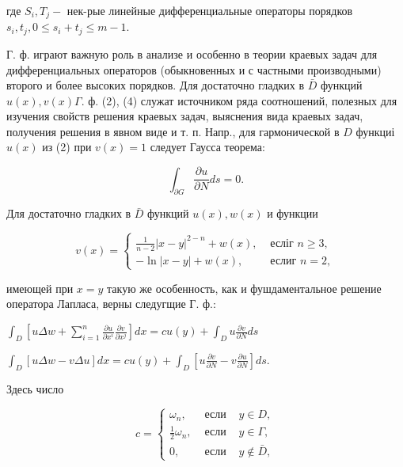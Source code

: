 \documentclass[10pt]{article}
\begin{document}
где $S_{i}, T_{j}-$ нек-рые линейные дифференциальные операторы порядков $s_{i}, t_{j}, 0 \leqslant s_{i}+t_{j} \leqslant m-1$.



Г. ф. играют важную роль в анализе и особенно в теории краевых задач для дифференциальных операторов (обыкновенных и с частными производными) второго и более высоких порядков. Для достаточно гладких в $\bar{D}$ функций $u(x), v(x) \Gamma$. ф. (2), (4) служат источником ряда соотношений, полезных для изучения свойств решения краевых задач, выяснения вида краевых задач, получения решения в явном виде и т. п. Напр., для гармонической в $D$ функциі $u(x)$ из (2) при $v(x)=1$ следует Гаусса теорема:



\[

\int_{\partial G} \frac{\partial u}{\partial N} d s=0 .

\]



Для достаточно гладких в $\bar{D}$ функций $u(x), w(x)$ и функции



\[

v(x)= \begin{cases}\frac{1}{n-2}|x-y|^{2-n}+w(x), & \text { есліг } n \geqslant 3, \\ -\ln |x-y|+w(x), & \text { еслиг } n=2,\end{cases}

\]



имеющей при $x=y$ такую же особенность, как и фушдаментальное решение оператора Лапласа, верны следугщие Г. ф.:



$\int_{D}\left[u \Delta w+\sum_{i=1}^{n} \frac{\partial u}{\partial x^{i}} \frac{\partial v}{\partial x^{j}}\right] d x=c u(y)+\int_{D} u \frac{\partial v}{\partial N} d s$



$\int_{D}[u \Delta w-v \Delta u] d x=c u(y)+\int_{D}\left[u \frac{\partial v}{\partial N}-v \frac{\partial u}{\partial N}\right] d s$.



Здесь число



\[

c=\left\{\begin{array}{lll}

\omega_{n}, & \text { если } & y \in D, \\

\frac{1}{2} \omega_{n}, & \text { если } & y \in \Gamma, \\

0, & \text { если } & y \notin \bar{D},

\end{array}\right.

\]
\end{document}
